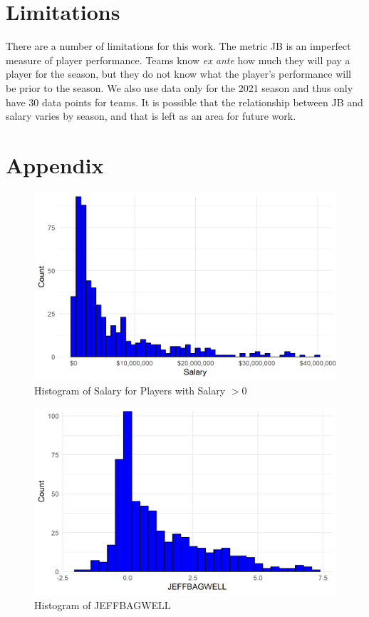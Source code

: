\documentclass{article}
\begin{document}
\section{Limitations}

There are a number of limitations for this work. The metric JB is an imperfect measure of player performance. Teams know \emph{ex ante} how much they will pay a player for the season, but they do not know what the player's performance will be prior to the season. We also use data only for the 2021 season and thus only have 30 data points for teams. It is possible that the relationship between JB and salary varies by season, and that is left as an area for future work. 




\section{Appendix}

\begin{figure}[t]
\caption{Histogram of Salary for Players with Salary $> 0$}
\label{fig:salary_hist}
\centering
\includegraphics[width=0.7\paperwidth, scale=1.25]{salary_hist.png}
\end{figure}

\begin{figure}[t]
\caption{Histogram of JEFFBAGWELL}
\label{fig:bwar_hist}
\centering
\includegraphics[width=0.7\paperwidth, scale=1.25]{war_hist.png}
\end{figure}

\label{tab:teams_picked}




\end{document}

